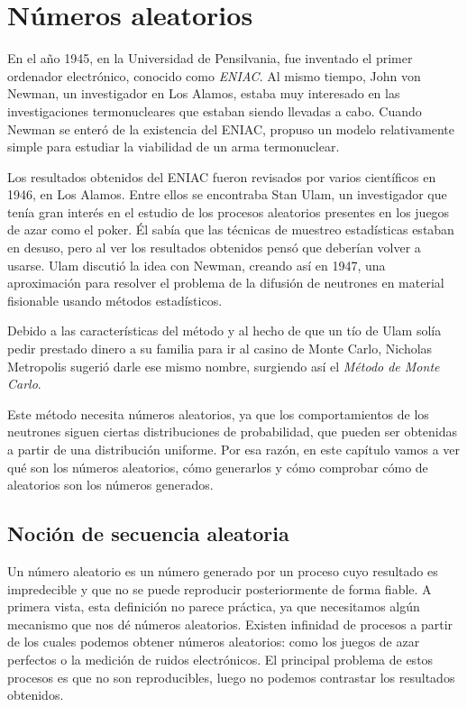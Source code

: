 \chapter{Números aleatorios}

En el año 1945, en la Universidad de Pensilvania, fue inventado el primer ordenador electrónico, conocido como \textit{ENIAC}. Al mismo tiempo, John von Newman, un investigador en Los Alamos, estaba muy interesado en las investigaciones termonucleares que estaban siendo llevadas a cabo. Cuando Newman se enteró de la existencia del ENIAC, propuso un modelo relativamente simple para estudiar la viabilidad de un arma termonuclear.

Los resultados obtenidos del ENIAC fueron revisados por varios científicos en 1946, en Los Alamos. Entre ellos se encontraba Stan Ulam, un investigador que tenía gran interés en el estudio de los procesos aleatorios presentes en los juegos de azar como el poker. Él sabía que las técnicas de muestreo estadísticas estaban en desuso, pero al ver los resultados obtenidos pensó que deberían volver a usarse. Ulam discutió la idea con Newman, creando así en 1947, una aproximación para resolver el problema de la difusión de neutrones en material fisionable usando métodos estadísticos.	

Debido a las características del método y al hecho de que un tío de Ulam solía pedir prestado dinero a su familia para ir al casino de Monte Carlo, Nicholas Metropolis sugerió darle ese mismo nombre, surgiendo así el \textit{Método de Monte Carlo}.

Este método necesita números aleatorios, ya que los comportamientos de los neutrones siguen ciertas distribuciones de probabilidad, que pueden ser obtenidas a partir de una distribución uniforme.  Por esa razón, en este capítulo vamos a ver qué son los números aleatorios, cómo generarlos y cómo comprobar cómo de aleatorios son los números generados.

\section{Noción de secuencia aleatoria}

Un número aleatorio es un número generado por un proceso cuyo resultado es impredecible y que no se puede reproducir posteriormente de forma fiable. A primera vista,  esta definición no parece práctica,  ya que necesitamos algún mecanismo que nos dé números aleatorios. Existen infinidad de procesos a partir de los cuales podemos obtener números aleatorios: como los juegos de azar perfectos o la medición de ruidos electrónicos. El principal problema de estos procesos es que no son reproducibles, luego no podemos contrastar los resultados obtenidos.

